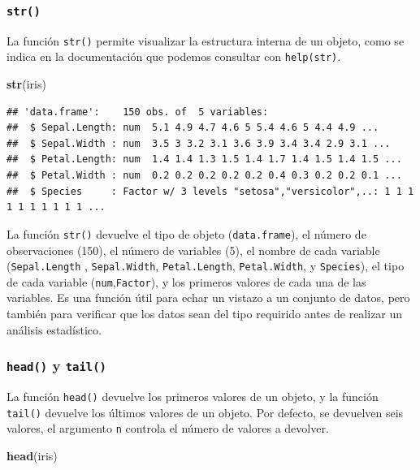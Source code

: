 \documentclass[]{book}
\newenvironment{Shaded}{\begin{snugshade}}{\end{snugshade}}
\newcommand{\KeywordTok}[1]{\textcolor[rgb]{0.13,0.29,0.53}{\textbf{#1}}}
\newcommand{\NormalTok}[1]{#1}
\begin{document}
\subsubsection{\texorpdfstring{\texttt{str()}}{str()}}\label{l015str}

La función \texttt{str()} permite visualizar la estructura interna de un
objeto, como se indica en la documentación que podemos consultar con
\texttt{help(str)}.

\begin{Shaded}
\begin{Highlighting}[]
\KeywordTok{str}\NormalTok{(iris)}
\end{Highlighting}
\end{Shaded}

\begin{verbatim}
## 'data.frame':    150 obs. of  5 variables:
##  $ Sepal.Length: num  5.1 4.9 4.7 4.6 5 5.4 4.6 5 4.4 4.9 ...
##  $ Sepal.Width : num  3.5 3 3.2 3.1 3.6 3.9 3.4 3.4 2.9 3.1 ...
##  $ Petal.Length: num  1.4 1.4 1.3 1.5 1.4 1.7 1.4 1.5 1.4 1.5 ...
##  $ Petal.Width : num  0.2 0.2 0.2 0.2 0.2 0.4 0.3 0.2 0.2 0.1 ...
##  $ Species     : Factor w/ 3 levels "setosa","versicolor",..: 1 1 1 1 1 1 1 1 1 1 ...
\end{verbatim}

La función \texttt{str()} devuelve el tipo de objeto
(\texttt{data.frame}), el número de observaciones (150), el número de
variables (5), el nombre de cada variable (\texttt{Sepal.Length} ,
\texttt{Sepal.Width}, \texttt{Petal.Length}, \texttt{Petal.Width}, y
\texttt{Species}), el tipo de cada variable
(\texttt{num},\texttt{Factor}), y los primeros valores de cada una de
las variables. Es una función útil para echar un vistazo a un conjunto
de datos, pero también para verificar que los datos sean del tipo
requirido antes de realizar un análisis estadístico.

\subsubsection{\texorpdfstring{\texttt{head()} y
\texttt{tail()}}{head() y tail()}}\label{l015head}

La función \texttt{head()} devuelve los primeros valores de un objeto, y
la función \texttt{tail()} devuelve los últimos valores de un objeto.
Por defecto, se devuelven seis valores, el argumento \texttt{n} controla
el número de valores a devolver.

\begin{Shaded}
\begin{Highlighting}[]
\KeywordTok{head}\NormalTok{(iris)}
\end{Highlighting}
\end{Shaded}
\end{document}

